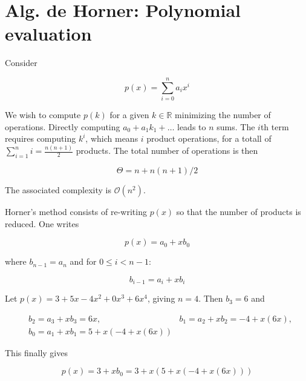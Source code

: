 \documentclass[12pt]{article}
\theoremstyle{definition}
\begin{document}
\section{Alg. de Horner: Polynomial evaluation} 

Consider 

\begin{equation*}
    p(x) = \sum_{i=0}^n a_ix^i
\end{equation*}

We wish to compute $p(k)$ for a given $k \in \mathbb{R}$ minimizing the number
of operations. Directly computing $a_0 + a_1k_1 + \ldots$ leads to $n$ sums. The
$i$th term requires computing $k^i$, which means $i$ product operations, for a
totall of $\sum_{i=1}^n i = \frac{n(n+1)}{2}$ products.  The total number of
operations is then 

\begin{equation*}
    \Theta = n + n(n+1) / 2
\end{equation*}

The associated complexity is $\mathcal{O}(n^2)$. 

Horner's method consists of re-writing $p(x)$ so that the number of products is
reduced. One writes 

\begin{equation*}
    p(x) = a_0 + x b_0
\end{equation*}

where $b_{n-1} = a_n$ and for $0 \leq i < n - 1$:

\begin{equation*}
    b_{i-1} = a_{i} + xb_{i}
\end{equation*}

\begin{shaded}
    \begin{example}
        \normalfont
        Let $p(x) = 3 + 5x -4x^2 + 0x^3 + 6x^4$, giving $n = 4$. Then 
        $b_{3} = 6$ and 

        \begin{align*}
            &b_2 = a_3 + xb_3 = 6x,  &b_1 = a_2 + xb_2 = -4 + x(6x),\\
            &b_0 = a_1 + xb_1 = 5 + x(-4+x(6x)) 
        \end{align*}

        This finally gives

        \begin{equation*}
            p(x) = 3 + xb_0 = 3+x(5 +
            x(-4+x(6x)))
        \end{equation*}
    \end{example}
\end{shaded}
\end{document}
